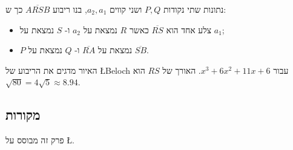 נתונות שתי נקודות
$P,Q$
ושני קווים
$a_2,a_1$,
בנו ריבוע
$\overline{ARSB}$
כך ש:
\begin{itemize}
\item 
צלע אחד הוא
$\overline{RS}$
כאשר
$R$
נמצאת על
$a_2$
ו-%
$S$
נמצאת על
$a_1$;
\item $P$
נמצאת על
$\overline{RA}$
ו-%
$Q$
נמצאת על
$\overline{SB}$.
\end{itemize}
האיור
מדגים את הריבוע של
\L{Beloch}
עבור 
$x^3+6x^2+11x+6$.
האורך של
$RS$
הוא
$\sqrt{80}=4\sqrt{5}\approx 8.94$. 




\subsection*{מקורות}

פרק זה מבוסס על
\L{\cite{bradford, hull-beloch, riaz}}.
